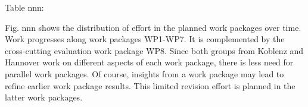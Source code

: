 Table nnn:


Fig. nnn shows the distribution of effort in the planned work packages over time. Work progresses along work packages WP1-WP7. It is complemented by the cross-cutting evaluation work package WP8. Since both groups from Koblenz and Hannover work on different aspects of each work package, there is less need for parallel work packages. Of course, insights from a work package may lead to refine earlier work package results. This limited revision effort is planned in the latter work packages.

